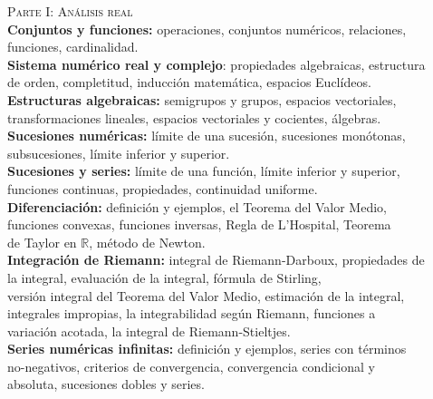 \documentclass[12pt,letterpaper]{article}
\newcommand\tab[1][1.5cm]{\hspace*{#1}}
\begin{document}
\tab \textsc{Parte I: Análisis real}\\
\tab \qquad \textbf{Conjuntos y funciones:} operaciones, conjuntos numéricos, relaciones,\\
	\tab \qquad \qquad funciones, cardinalidad.\\
	\tab \qquad \textbf{Sistema numérico real y complejo}: propiedades algebraicas, estructura \\
	\tab \qquad \qquad de orden, completitud, inducción matemática, espacios Euclídeos.\\
\tab \qquad \textbf{Estructuras algebraicas:} semigrupos y grupos, espacios vectoriales, \\
	\tab \qquad \qquad transformaciones lineales, espacios vectoriales y cocientes, álgebras. \\
\tab \qquad \textbf{Sucesiones numéricas:} límite de una sucesión, sucesiones monótonas, \\
	\tab \qquad \qquad subsucesiones, límite inferior y superior.\\
\tab \qquad \textbf{Sucesiones y series:} límite de una función, límite inferior y superior, \\
	\tab \qquad \qquad funciones continuas, propiedades, continuidad uniforme.\\
\tab \qquad \textbf{Diferenciación:} definición y ejemplos, el Teorema del Valor Medio, \\
	\tab \qquad \qquad funciones convexas, funciones inversas, Regla de L'Hospital, Teorema \\ 
	\tab \qquad \qquad de Taylor en $\mathbb{R}$, método de Newton.\\
\tab \qquad \textbf{Integración de Riemann:} integral de Riemann-Darboux, propiedades de \\
	\tab \qquad \qquad la integral, evaluación de la integral, fórmula de Stirling,\\ 
	\tab \qquad \qquad versión integral del Teorema del Valor Medio, estimación de la integral, \\
	\tab \qquad \qquad integrales impropias, la integrabilidad según Riemann, funciones a \\ 
	\tab \qquad \qquad variación acotada, la integral de Riemann-Stieltjes.\\
\tab \qquad \textbf{Series numéricas infinitas:} definición y ejemplos, series con términos \\
	\tab \qquad \qquad no-negativos, criterios de convergencia, convergencia condicional y \\
	\tab \qquad \qquad absoluta, sucesiones dobles y series. \\
\end{document}
